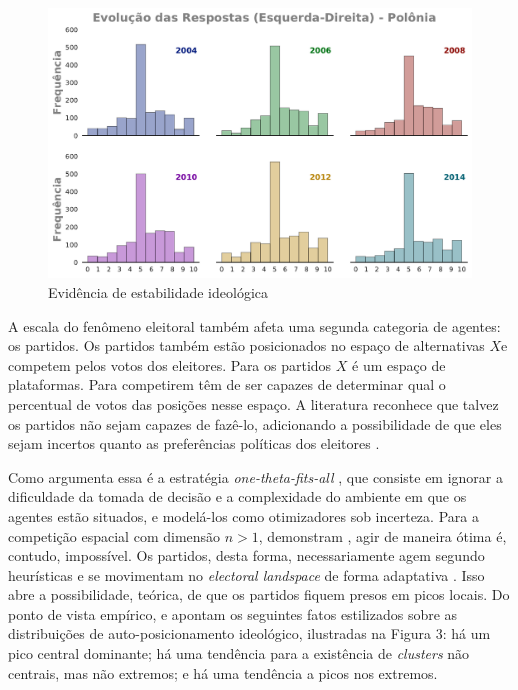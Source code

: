 \begin{figure}[H]
  \centering \includegraphics[width = \textwidth]{ims/ess_Pol_plots.pdf}
  \caption{Evidência de estabilidade ideológica}
\end{figure}

A escala do fenômeno eleitoral também afeta uma segunda categoria de agentes: os
partidos. Os partidos também estão posicionados no espaço de alternativas \(X\)e
competem pelos votos dos eleitores. Para os partidos \(X\) é um espaço de
plataformas. Para competirem têm de ser capazes de determinar qual o percentual
de votos das posições nesse espaço. A literatura reconhece que talvez os
partidos não sejam capazes de fazê-lo, adicionando a possibilidade de que eles
sejam incertos quanto as preferências políticas dos eleitores
\cite{glazer1989model, grofman2004downs}.


Como argumenta  essa é a estratégia
\textit{one-theta-fits-all} , que consiste em ignorar a dificuldade da tomada de
decisão e a complexidade do ambiente em que os agentes estão situados, e
modelá-los como otimizadores sob incerteza. Para a competição espacial com
dimensão $n>1$, demonstram , agir de maneira
ótima é, contudo, impossível. Os partidos, desta forma, necessariamente agem
segundo heurísticas e se movimentam no \textit{electoral landspace} de forma
adaptativa \cite{kollman1998political, de1999adaptive}. Isso abre a
possibilidade, teórica, de que os partidos fiquem presos em picos locais. Do
ponto de vista empírico,  e
 apontam os seguintes fatos estilizados sobre as
distribuições de auto-posicionamento ideológico, ilustradas na Figura 3: há um
pico central dominante; há uma tendência para a existência de \textit{clusters}
não centrais, mas não extremos; e há uma tendência a picos nos extremos.

